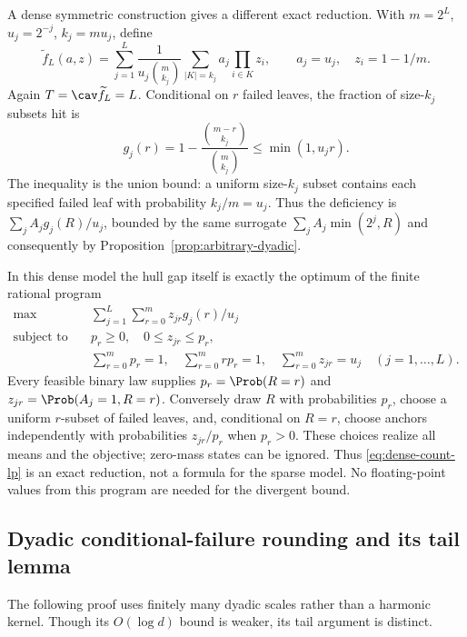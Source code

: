A dense symmetric construction gives a different exact reduction.
With $m=2^L$, $u_j=2^{-j}$, $k_j=mu_j$, define
\begin{equation}\label{eq:dense-predecessor}
 \widetilde f_L(a,z)=\sum_{j=1}^L\frac1{u_j\binom m{k_j}}
             \sum_{|K|=k_j}a_j\prod_{i\in K}z_i,
 \qquad a_j=u_j,\quad z_i=1-1/m.
\end{equation}
Again $T=\cav\widetilde f_L=L$. Conditional on $r$ failed leaves, the
fraction of size-$k_j$ subsets hit is
\[
 g_j(r)=1-\frac{\binom{m-r}{k_j}}{\binom m{k_j}}
       \le\min(1,u_jr).
\]
The inequality is the union bound: a uniform size-$k_j$ subset contains
each specified failed leaf with probability $k_j/m=u_j$.
Thus the deficiency is $\sum_j A_jg_j(R)/u_j$, bounded by the same
surrogate $\sum_j A_j\min(2^j,R)$ and consequently by
Proposition~\ref{prop:arbitrary-dyadic}.

In this dense model the hull gap itself is exactly the optimum of the
finite rational program
\begin{equation}\label{eq:dense-count-lp}
 \begin{aligned}
 \max\quad&\sum_{j=1}^L\sum_{r=0}^m z_{jr}g_j(r)/u_j\\
 \text{subject to}\quad& p_r\ge0,\quad 0\le z_{jr}\le p_r,\\
 &\sum_{r=0}^mp_r=1,\quad \sum_{r=0}^mrp_r=1,
       \quad\sum_{r=0}^mz_{jr}=u_j\quad(j=1,\ldots,L).
 \end{aligned}
\end{equation}
Every feasible binary law supplies $p_r=\Prob(R=r)$ and
$z_{jr}=\Prob(A_j=1,R=r)$. Conversely draw $R$ with probabilities $p_r$,
choose a uniform $r$-subset of failed leaves, and, conditional on $R=r$,
choose anchors independently with probabilities $z_{jr}/p_r$ when
$p_r>0$. These choices realize all means and the objective; zero-mass
states can be ignored. Thus \eqref{eq:dense-count-lp} is an exact reduction,
not a formula for the sparse model. No floating-point values from this
program are needed for the divergent bound.

\subsection{Dyadic conditional-failure rounding and its tail lemma}
\label{app:dyadic-rounding}
The following proof uses finitely many dyadic scales rather than a
harmonic kernel. Though its $O(\log d)$ bound is weaker, its tail
argument is distinct.

